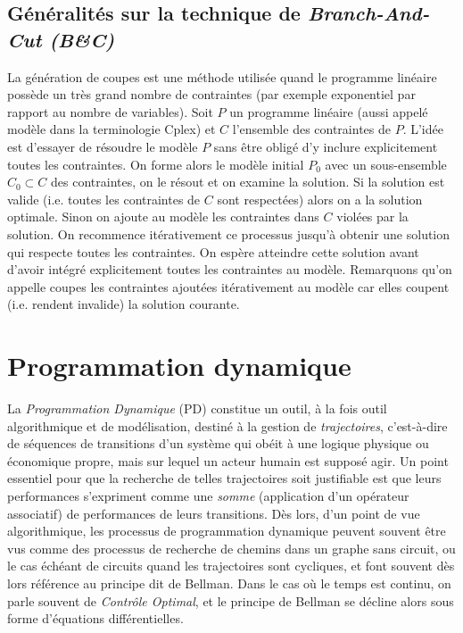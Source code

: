 \subsection{Généralités sur la technique de \textit{Branch-And-Cut (B\&C)}}
La génération de coupes est une méthode utilisée quand le programme linéaire possède un très grand nombre de contraintes (par exemple exponentiel par rapport au nombre de variables). 
Soit $P$ un programme linéaire (aussi appelé modèle dans la terminologie Cplex) et $C$ l'ensemble des contraintes de $P$. L'idée est d'essayer de résoudre le modèle $P$ sans être obligé d'y inclure explicitement toutes les contraintes. On forme alors le modèle initial $P_0$ avec un sous-ensemble $C_0 \subset C$ des contraintes, on le résout et on examine la solution. Si la solution est valide (i.e. toutes les contraintes de $C$ sont respectées) alors on a la solution optimale. Sinon on ajoute au modèle les contraintes dans $C$ violées par la solution. On recommence itérativement ce processus jusqu'à obtenir une solution qui respecte toutes les contraintes. On espère atteindre cette solution avant d'avoir intégré explicitement toutes les contraintes au modèle.
Remarquons qu'on appelle coupes les contraintes ajoutées itérativement au modèle car elles coupent (i.e. rendent invalide) la solution courante.

\section{Programmation dynamique}

La \textit{Programmation Dynamique} (PD) \cite{doi:10.1126/science.153.3731.34} \cite{brown1965iterative} \cite{karp1967finite} \cite{mitten1964composition} \cite{nemhauser1966introduction}  %
 constitue un outil, à la fois outil algorithmique et de modélisation, destiné à la gestion de \textit{trajectoires}, c'est-à-dire de séquences de transitions d'un système qui obéit à une logique physique ou économique propre, mais sur lequel un acteur humain est supposé agir. Un point essentiel pour que la recherche de telles trajectoires soit justifiable est que leurs performances s'expriment comme une \textit{somme} (application d'un opérateur associatif) de performances de leurs transitions. Dès lors, d'un point de vue algorithmique, les processus de programmation dynamique peuvent souvent être vus comme des processus de recherche de chemins dans un graphe sans circuit, ou le cas échéant de circuits quand les trajectoires sont cycliques, et font souvent dès lors référence au principe dit de Bellman. Dans le cas où le temps est continu, on parle souvent de \textit{Contrôle Optimal}, et le principe de Bellman se décline alors sous forme d'équations différentielles. 

